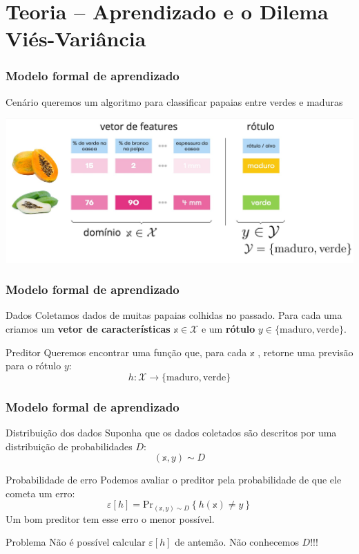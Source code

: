 \section*{Teoria – Aprendizado e o Dilema Viés-Variância}

\begin{frame}
    \frametitle{Modelo formal de aprendizado}

    \begin{block}{Cenário}
        queremos um algoritmo para classificar papaias entre verdes e maduras\parencite{shalev}
    \end{block}
    \begin{center}
        \includegraphics[width=0.8\paperwidth]{./imgs/fig8-papaya-scenario.jpg}
    \end{center}
\end{frame}


\begin{frame}
    \frametitle{Modelo formal de aprendizado}
    \begin{block}{Dados}
        Coletamos dados de muitas papaias colhidas no passado. Para cada uma criamos um \textbf{vetor de características} $\mathbb{x}\in\mathcal{X}$ e um \textbf{rótulo} $y\in\{\text{maduro}, \text{verde}\}$.
    \end{block}

    \begin{block}{Preditor}
        Queremos encontrar uma função que, para cada $\mathbb{x}$ , retorne uma previsão para o rótulo $y$: 
        $$h: \mathcal{X}\to\{\text{maduro}, \text{verde}\}$$
    \end{block}
\end{frame}

\begin{frame}
    \frametitle{Modelo formal de aprendizado}
    \begin{block}{Distribuição dos dados}
        Suponha que os dados coletados são descritos por uma distribuição de probabilidades $D$:
        $$(\mathbb{x}, y) \sim D$$
    \end{block}
    \begin{block}{Probabilidade de erro}
        Podemos avaliar o preditor pela probabilidade de que ele cometa um erro:
        $$\varepsilon[h] = \mathrm{Pr}_{(\mathbb{x}, y) \sim D}\left\{h(\mathbb{x})\neq y\right\}$$
        Um bom preditor tem esse erro o menor possível.
    \end{block}
    \begin{alertblock}{Problema}
        Não é possível calcular $\varepsilon[h]$ de antemão. Não conhecemos $D$!!!
    \end{alertblock}
\end{frame}

